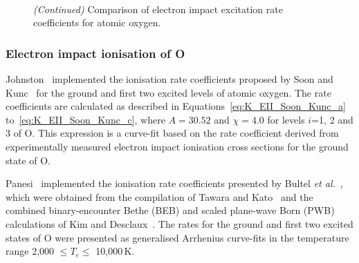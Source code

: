 {\begin{figure}[!hbtp]
  \\
 \caption{\textit{(Continued)} Comparison of  electron impact excitation rate coefficients for atomic oxygen.}
 \label{fig:K_EIE_O}
\end{figure}

\subsubsection{Electron impact ionisation of O}

Johnston~\cite{JohnPhd} implemented the ionisation rate coefficients proposed by Soon and Kunc~\cite{SK1990} for the ground and first two excited levels of atomic oxygen.
The rate coefficients are calculated as described in Equations~\ref{eq:K_EII_Soon_Kunc_a} to~\ref{eq:K_EII_Soon_Kunc_c}, where $A=30.52$ and $\chi=4.0$ for levels $i$=1, 2 and 3 of O.
This expression is a curve-fit based on the rate coefficient derived from experimentally measured electron impact ionisation cross sections for the ground state of O.

\par

Panesi~\cite{panesi_phd} implemented the ionisation rate coefficients presented by Bultel \textit{et al.}~\cite{BBB+2006}, which were obtained from the compilation of Tawara and Kato~\cite{TK1999} and the combined binary-encounter Bethe (BEB) and scaled plane-wave Born (PWB) calculations of Kim and Desclaux~\cite{KD2002}.
The rates for the ground and first two excited states of O were presented as generalised Arrhenius curve-fits in the temperature range 2,000 $\leq T_e \leq$ 10,000\,K.

}
